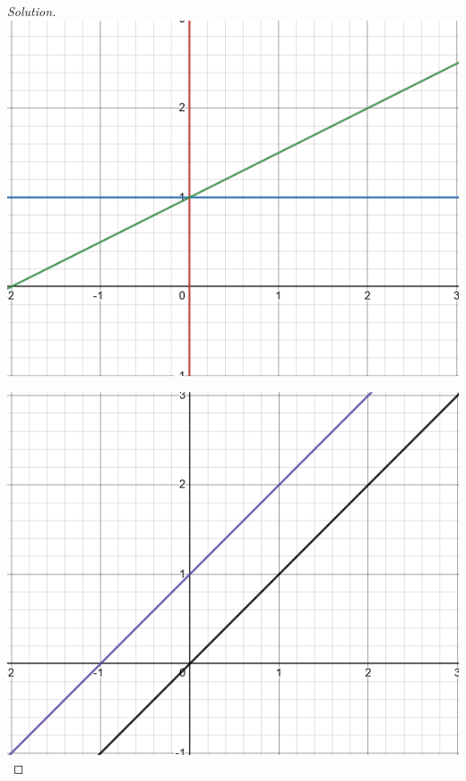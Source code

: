 \documentclass[10pt]{article}
\begin{document}
\begin{proof}[Solution]
\begin{minipage}{0.30\linewidth}
\includegraphics[width=\linewidth]{z_1_lines}
\end{minipage}
\begin{minipage}{0.30\linewidth}
\includegraphics[width=\linewidth]{z_2_lines}
\end{minipage}
\begin{minipage}{0.30\linewidth}

\end{minipage}
\end{proof}
\end{document}
